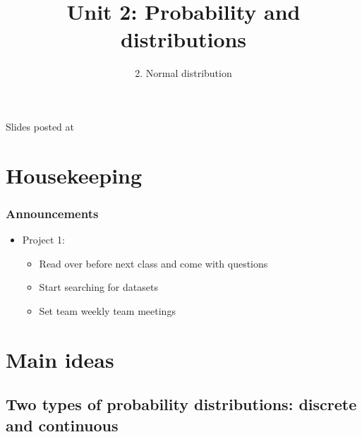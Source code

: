 \documentclass[11pt,containsverbatim,handout,xcolor=xelatex,dvipsnames,table]{beamer}
\title{Unit 2: Probability and distributions}
\subtitle{2. Normal distribution}
\author{\CourseName}
\date{}
\institute{\InstituteName}
\begin{document}



\begin{frame}[plain]

\titlepage

\vfill

{\scriptsize {} \hfill Slides posted at  \webURL{\CourseSite}}

\addtocounter{framenumber}{-1} 

\end{frame}


\section{Housekeeping}


\begin{frame}
\frametitle{Announcements}

\begin{itemize}

\item Project 1: 
\begin{itemize}
\item Read over before next class and come with questions
\item Start searching for datasets
\item Set team weekly team meetings
\end{itemize}

\end{itemize}

\end{frame}


\section{Main ideas}


\subsection{Two types of probability distributions: discrete and continuous}
\label{mi1}
\end{document}
